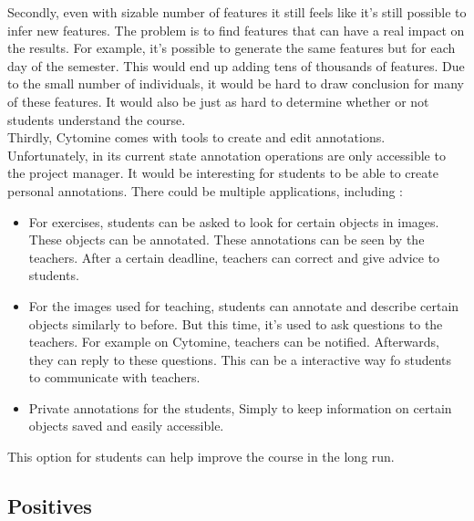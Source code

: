 \documentclass[a4paper,11pt]{report}
\numberwithin{figure}{section} %
\begin{document}
        Secondly, even with sizable number of features it still feels like it's still possible to infer new features.
        The problem is to find features that can have a real impact on the results.
        For example, it's possible to generate the same features but for each day of the semester.
        This would end up adding tens of thousands of features.
        Due to the small number of individuals, it would be hard to draw conclusion for many of these features.
        It would also be just as hard to determine whether or not students understand the course.\\

        Thirdly, Cytomine comes with tools to create and edit annotations.
        Unfortunately, in its current state annotation operations are only accessible to the project manager.
        It would be interesting for students to be able to create personal annotations.
        There could be multiple applications, including :
        \begin{itemize}
            \item[\textbullet] For exercises, students can be asked to look for certain objects in images.
            These objects can be annotated.
            These annotations can be seen by the teachers.
            After a certain deadline, teachers can correct and give advice to students.
            \item[\textbullet] For the images used for teaching, students can annotate and describe certain objects similarly to before.
            But this time, it's used to ask questions to the teachers.
            For example on Cytomine, teachers can be notified.
            Afterwards, they can reply to these questions.
            This can be a interactive way fo students to communicate with teachers.
            \item[\textbullet] Private annotations for the students, Simply to keep information on certain objects saved and easily accessible.
        \end{itemize}
        This option for students can help improve the course in the long run.

    \subsection{Positives}
\end{document}
